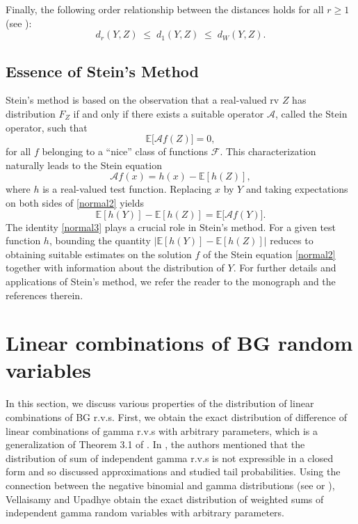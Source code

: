 \documentclass[12pt, a4paper,reqno]{amsart}
\theoremstyle{definition}
\theoremstyle{myremark}
\numberwithin{equation}{section}
\begin{document}
\vfill
\noindent
Finally, the following order relationship between the distances holds for all $r \geq 1$ (see \cite[equation 2.16]{k0}):
\begin{equation}\label{metrico1}
d_r(Y,Z) \;\leq\; d_1(Y,Z) \;\leq\; d_W(Y,Z).
\end{equation}
\subsection{Essence of Stein's Method}
Stein's method is based on the observation that a real-valued rv $Z$ has distribution $F_Z$ if and only if there exists a suitable operator $\mathcal{A}$, called the Stein operator, such that
$$
\mathbb{E}\big[\mathcal{A}f(Z)\big] = 0,
$$
for all $f$ belonging to a ``nice'' class of functions $\mathcal{F}$. This characterization naturally leads to the Stein equation
\begin{equation}\label{normal2}
\mathcal{A}f(x) = h(x) - \mathbb{E}[h(Z)],
\end{equation}
where $h$ is a real-valued test function. Replacing $x$ by $Y$ and taking expectations on both sides of \eqref{normal2} yields
\begin{equation}\label{normal3}
\mathbb{E}[h(Y)] - \mathbb{E}[h(Z)] = \mathbb{E}\big[\mathcal{A}f(Y)\big].
\end{equation}
The identity \eqref{normal3} plays a crucial role in Stein's method. For a given test function $h$, bounding the quantity $\big|\mathbb{E}[h(Y)] - \mathbb{E}[h(Z)]\big|$ reduces to obtaining suitable estimates on the solution $f$ of the Stein equation \eqref{normal2} together with information about the distribution of $Y$. For further details and applications of Stein's method, we refer the reader to the monograph \cite{nourdin} and the references therein.

\vspace{-.25cm}

\section{Linear combinations of BG random variables}\label{probgdistribution}
\noindent
 In this section, we discuss various properties of the distribution of linear combinations of BG r.v.s. First, we obtain the exact distribution of difference of linear combinations of gamma r.v.s with arbitrary parameters, which is a generalization of Theorem 3.1 of \cite{pvns2009}. In \cite{DP1990}, the authors mentioned that the distribution of sum of independent gamma r.v.s is not expressible in a closed form and so discussed approximations and studied tail probabilities. Using the connection between the negative binomial and gamma distributions (see \cite{EZ1980} or \cite{VS2010}), Vellaisamy and Upadhye \cite{pvns2009} obtain the exact distribution of weighted sums of independent gamma random variables with arbitrary parameters. 
 \vspace{-.5cm}
\end{document}
